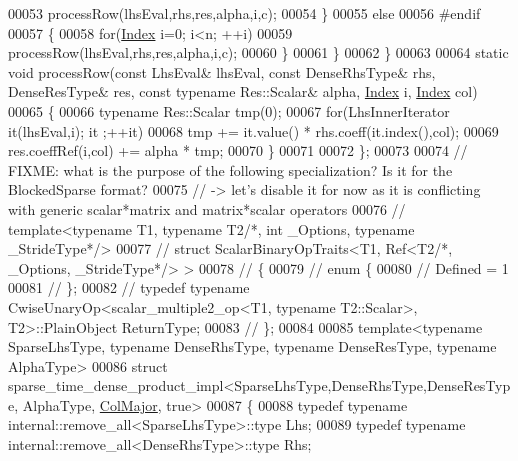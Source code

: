 \begin{DoxyCode}
00053           processRow(lhsEval,rhs,res,alpha,i,c);
00054       \}
00055       \textcolor{keywordflow}{else}
00056 \textcolor{preprocessor}{#endif}
00057       \{
00058         \textcolor{keywordflow}{for}(\hyperlink{namespace_eigen_a62e77e0933482dafde8fe197d9a2cfde}{Index} i=0; i<n; ++i)
00059           processRow(lhsEval,rhs,res,alpha,i,c);
00060       \}
00061     \}
00062   \}
00063   
00064   \textcolor{keyword}{static} \textcolor{keywordtype}{void} processRow(\textcolor{keyword}{const} LhsEval& lhsEval, \textcolor{keyword}{const} DenseRhsType& rhs, DenseResType& res, \textcolor{keyword}{const} \textcolor{keyword}{typename}
       Res::Scalar& alpha, \hyperlink{namespace_eigen_a62e77e0933482dafde8fe197d9a2cfde}{Index} i, \hyperlink{namespace_eigen_a62e77e0933482dafde8fe197d9a2cfde}{Index} col)
00065   \{
00066     \textcolor{keyword}{typename} Res::Scalar tmp(0);
00067     \textcolor{keywordflow}{for}(LhsInnerIterator it(lhsEval,i); it ;++it)
00068       tmp += it.value() * rhs.coeff(it.index(),col);
00069     res.coeffRef(i,col) += alpha * tmp;
00070   \}
00071   
00072 \};
00073 
00074 \textcolor{comment}{// FIXME: what is the purpose of the following specialization? Is it for the BlockedSparse format?}
00075 \textcolor{comment}{// -> let's disable it for now as it is conflicting with generic scalar*matrix and matrix*scalar operators}
00076 \textcolor{comment}{// template<typename T1, typename T2/*, int \_Options, typename \_StrideType*/>}
00077 \textcolor{comment}{// struct ScalarBinaryOpTraits<T1, Ref<T2/*, \_Options, \_StrideType*/> >}
00078 \textcolor{comment}{// \{}
00079 \textcolor{comment}{//   enum \{}
00080 \textcolor{comment}{//     Defined = 1}
00081 \textcolor{comment}{//   \};}
00082 \textcolor{comment}{//   typedef typename CwiseUnaryOp<scalar\_multiple2\_op<T1, typename T2::Scalar>, T2>::PlainObject
       ReturnType;}
00083 \textcolor{comment}{// \};}
00084 
00085 \textcolor{keyword}{template}<\textcolor{keyword}{typename} SparseLhsType, \textcolor{keyword}{typename} DenseRhsType, \textcolor{keyword}{typename} DenseResType, \textcolor{keyword}{typename} AlphaType>
00086 \textcolor{keyword}{struct }sparse\_time\_dense\_product\_impl<SparseLhsType,DenseRhsType,DenseResType, AlphaType, 
      \hyperlink{group__enums_ggaacded1a18ae58b0f554751f6cdf9eb13a0cbd4bdd0abcfc0224c5fcb5e4f6669a}{ColMajor}, true>
00087 \{
00088   \textcolor{keyword}{typedef} \textcolor{keyword}{typename} internal::remove\_all<SparseLhsType>::type Lhs;
00089   \textcolor{keyword}{typedef} \textcolor{keyword}{typename} internal::remove\_all<DenseRhsType>::type Rhs;

\end{DoxyCode}
